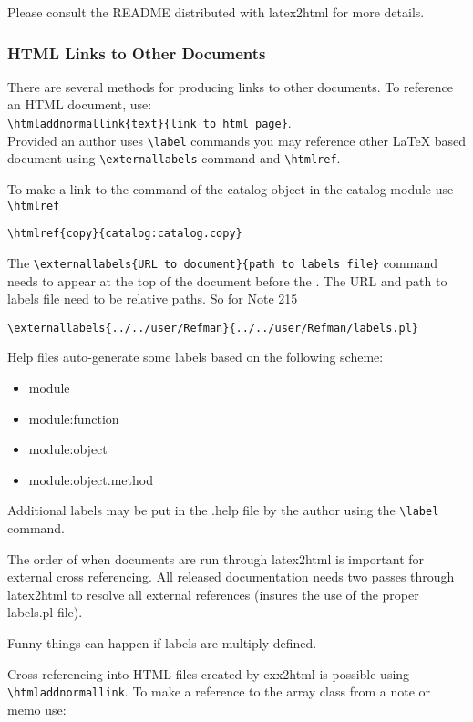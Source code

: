 Please consult the README distributed with latex2html for more details.

\subsubsection{HTML Links to Other Documents}
There are several methods for producing links to other documents.  To
reference an HTML document, use:\\
\verb!\htmladdnormallink{text}{link to html page}!.\\
Provided an author uses
\verb!\label! commands you may reference other 
LaTeX based document using 
\verb!\externallabels! command and \verb!\htmlref!.

To make a link to the  command of the
catalog object in the catalog module use \verb!\htmlref!
\begin{verbatim}
\htmlref{copy}{catalog:catalog.copy}
\end{verbatim}

The \verb!\externallabels{URL to document}{path to labels file}! command
needs to appear at the top of the document before the \verb!!. 
The URL and path to labels file need to be relative paths.  So for Note 215
\begin{verbatim}
\externallabels{../../user/Refman}{../../user/Refman/labels.pl}
\end{verbatim}

Help files auto-generate some labels based on the following scheme:
\begin{itemize}
\item module
\item module:function
\item module:object
\item module:object.method
\end{itemize}
Additional labels may be put in the .help file by the author using the 
\verb!\label! command.

The order of when documents are run through latex2html is important
for external cross referencing. All released 
documentation needs two passes through latex2html to resolve all 
external references (insures the use of the proper labels.pl file).  

Funny things can happen if labels are multiply defined.


Cross referencing into HTML files created by cxx2html is possible using
\verb!\htmladdnormallink!.  To make a reference to the array class
from a note or memo use:
\begin{verbatim}
\end{verbatim}

